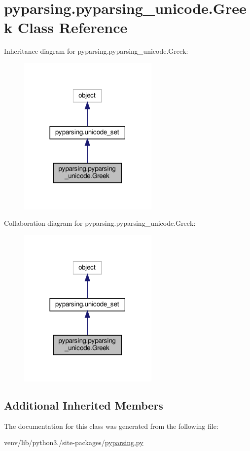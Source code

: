 \hypertarget{classpyparsing_1_1pyparsing__unicode_1_1Greek}{}\section{pyparsing.\+pyparsing\+\_\+unicode.\+Greek Class Reference}
\label{classpyparsing_1_1pyparsing__unicode_1_1Greek}


Inheritance diagram for pyparsing.\+pyparsing\+\_\+unicode.\+Greek\+:
\nopagebreak
\begin{figure}[H]
\begin{center}
\leavevmode
\includegraphics[width=194pt]{classpyparsing_1_1pyparsing__unicode_1_1Greek__inherit__graph}
\end{center}
\end{figure}


Collaboration diagram for pyparsing.\+pyparsing\+\_\+unicode.\+Greek\+:
\nopagebreak
\begin{figure}[H]
\begin{center}
\leavevmode
\includegraphics[width=194pt]{classpyparsing_1_1pyparsing__unicode_1_1Greek__coll__graph}
\end{center}
\end{figure}
\subsection*{Additional Inherited Members}


The documentation for this class was generated from the following file\+:\begin{DoxyCompactItemize}
\item 
venv/lib/python3./site-\/packages/\hyperlink{pyparsing_8py}{pyparsing.\+py}\end{DoxyCompactItemize}
